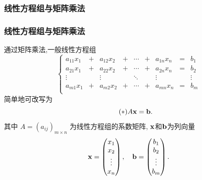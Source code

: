 \subsubsection{线性方程组与矩阵乘法}
\begin{frame}\frametitle{线性方程组与矩阵乘法}
通过矩阵乘法,一般线性方程组
\begin{equation*}
\left\{\begin{array}{ccccccccc}
a_{11}x_1& +& a_{12}x_2 & + & \cdots & + & a_{1n}x_n &= & b_1\\
a_{21}x_1& +& a_{22}x_2 & + & \cdots & + & a_{2n}x_n &= & b_2\\
\vdots && 	\vdots && 	\ddots && 	\vdots && 	\vdots \\
a_{m1}x_1& +& a_{m2}x_2 & + & \cdots & + & a_{mn}x_n &= & b_m\\
\end{array}\right.
\end{equation*}
\pp
简单地可改写为
\begin{equation}\label{system_of_linear_equations}\tag{$*$}
A\bf x=\bf b.
\end{equation}
\pp
其中 $A=(a_{ij})_{m\times n}$ 为线性方程组的系数矩阵, $\bf x$和$\bf b$为列向量
\[\bf x=\begin{pmatrix}x_1\\x_2\\\vdots\\x_n\end{pmatrix},\quad  \bf b=\begin{pmatrix}b_1\\b_2\\\vdots\\b_m\end{pmatrix}.\]
\end{frame}





